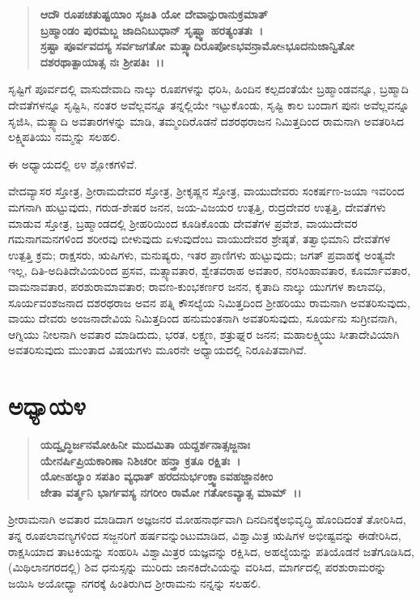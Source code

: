 \begin{verse}
\textbf{ಆದೌ ರೂಪಚತುಷ್ಟಯಿಾಂ ಸೃಜತಿ ಯೋ ದೇವಾನ್ಪುರಾನುಕ್ರಮಾತ್\\ ಬ್ರಹ್ಮಾಂಡಂ ಪುರಮಬ್ಜ ಜಾದಿನಿಬುಧಾನ್ ಸೃಷ್ಟ್ವಾ ಹರತ್ಯಂತತಃ~।}\\\textbf{ಸ್ರಷ್ಟಾ ಪೂರ್ವವದಸ್ಯ ಸರ್ವಜಗತೋ ಮತ್ಸ್ಯಾದಿರೂಪೋಽಭವನ್\break ರಾಮೋsಭೂದನುಜಾನ್ವಿತೋ ದಶರಥಾತ್ಪಾಯಾತ್ಸ ನಃ ಶ‍್ರೀಪತಿಃ~।।}
\end{verse}

ಸೃಷ್ಟಿಗೆ ಪೂರ್ವದಲ್ಲಿ ವಾಸುದೇವಾದಿ ನಾಲ್ಕು ರೂಪಗಳನ್ನು ಧರಿಸಿ, ಹಿಂದಿನ ಕಲ್ಪದಂತೆಯೇ ಬ್ರಹ್ಮಾಂಡವನ್ನೂ, ಬ್ರಹ್ಮಾದಿ ದೇವತೆಗಳನ್ನೂ ಸೃಷ್ಟಿಸಿ, ನಂತರ ಅವೆಲ್ಲವನ್ನೂ ತನ್ನಲ್ಲಿಯೇ ಇಟ್ಟುಕೊಂಡು, ಸೃಷ್ಟಿ ಕಾಲ ಬಂದಾಗ ಪುನಃ ಅವೆಲ್ಲವನ್ನೂ ಸೃಜಿಸಿ, ಮತ್ಸ್ಯಾದಿ ಅವತಾರಗಳನ್ನು ಮಾಡಿ, ತಮ್ಮಂದಿರೊಡನೆ ದಶರಥರಾಜನ ನಿಮಿತ್ತದಿಂದ ರಾಮನಾಗಿ ಅವತರಿಸಿದ ಲಕ್ಷ್ಮಿಪತಿಯು ನಮ್ಮನ್ನು ಸಲಹಲಿ.

ಈ ಅಧ್ಯಾಯದಲ್ಲಿ ೮೪ ಶ್ಲೋಕಗಳಿವೆ.

ವೇದವ್ಯಾಸರ ಸ್ತೋತ್ರ, ಶ‍್ರೀರಾಮದೇವರ ಸ್ತೋತ್ರ, ಶ‍್ರೀಕೃಷ್ಣನ ಸ್ತೋತ್ರ, ವಾಯುದೇವರು ಸಂಕರ್ಷಣ-ಜಯಾ ಇವರಿಂದ ಮಗನಾಗಿ ಹುಟ್ಟುವುದು, ಗರುಡ-ಶೇಷರ ಜನನ, ಜಯ-ವಿಜಯರ ಉತ್ಪತ್ತಿ, ರುದ್ರದೇವರ ಉತ್ಪತ್ತಿ, ದೇವತೆಗಳು ಮಾಡುವ ಸ್ತೋತ್ರ, ಬ್ರಹ್ಮಾಂಡದಲ್ಲಿ ಶ‍್ರೀಹರಿಯಿಂದ ಕೂಡಿಕೊಂಡು ದೇವತೆಗಳ ಪ್ರವೇಶ, ವಾಯುದೇವರ ಗಮನಾಗಮನಗಳಿಂದ ಶರೀರವು ಬೀಳುವುದು ಏಳುವುದೆಂಬ ವಾಯುದೇವರ ಶ್ರೇಷ್ಠತೆ, ತತ್ವಾಭಿಮಾನಿ ದೇವತೆಗಳ ಉತ್ಪತ್ತಿ ಕ್ರಮ; ರಾಕ್ಷಸರು, ಋಷಿಗಳು, ಮನುಷ್ಯರು, ಇತರ ಪ್ರಾಣಿಗಳು ಹುಟ್ಟುವುದು; ಜಗತ್ ಪ್ರವಾಹಕ್ಕೆ ಅಂತ್ಯವೇ ಇಲ್ಲ, ದಿತಿ-ಅದಿತಿದೇವಿಯರಿಂದ ಪ್ರಸವ, ಮತ್ಸ್ಯಾವತಾರ, ಶ್ವೇತವರಾಹ ಅವತಾರ, ನರಸಿಂಹಾವತಾರ, ಕೂರ್ಮಾವತಾರ, ವಾಮನಾವತಾರ, ಪರಶುರಾಮಾವತಾರ; ರಾವಣ-ಕುಂಭಕರ್ಣರ ಜನನ, ಕೃತಾದಿ ನಾಲ್ಕು ಯುಗಗಳ ಕಾಲಾವಧಿ, ಸೂರ್ಯವಂಶಜನಾದ ದಶರಥರಾಜ ಅವನ ಪತ್ನಿ ಕೌಸಲ್ಯೆಯ ನಿಮಿತ್ತದಿಂದ ಶ‍್ರೀಹರಿಯು ರಾಮನಾಗಿ ಅವತರಿಸುವುದು, ವಾಯು ದೇವರು ಅಂಜನಾದೇವಿಯ ನಿಮಿತ್ತದಿಂದ ಹನುಮಂತನಾಗಿ ಅವತರಿಸುವುದು, ಸೂರ್ಯನು ಸುಗ್ರೀವನಾಗಿ, ಆಗ್ನಿಯು ನೀಲನಾಗಿ ಅವತಾರ ಮಾಡಿದುದು, ಭರತ, ಲಕ್ಷ್ಮಣ, ಶತ್ರುಘ್ನರ ಜನನ; ಮಹಾಲಕ್ಷ್ಮಿಯು ಸೀತಾದೇವಿಯಾಗಿ ಅವತರಿಸುವುದು ಮುಂತಾದ ವಿಷಯಗಳು ಮೂರನೇ ಅಧ್ಯಾಯದಲ್ಲಿ ನಿರೂಪಿತ\-ವಾಗಿವೆ.


\section*{ಅಧ್ಯಾಯ\enginline{-}೪}

\begin{verse}
\textbf{ಯದ್ವೃದ್ಧಿರ್ಜನಮೋಹಿನೀ ಮುದಮಿತಾ ಯದ್ದರ್ಶನಾತ್ಸಜ್ಜನಾಃ}\\\textbf{ಯೇನರ್ಷಿಪ್ರಿಯಕಾರಿಣಾ ನಿಶಿಚರೀ ಹನ್ತ್ರಾ ಕ್ರತೂ ರಕ್ಷಿತಃ~।}\\\textbf{ಯೋsಹಲ್ಯಾಂ ಸಪತಿಂ ವ್ಯಧಾತ್‌ ಹರದನುರ್ಭಂಕ್ತ್ವಾಽವಹಜ್ಜಾನಕೀಂ}\\\textbf{ಜೇತಾ ವರ್ತ್ಮನಿ ಭಾರ್ಗವಸ್ಯ ನಗರೀಂ ರಾಮೋ ಗತೋಽವ್ಯಾತ್ಸ ಮಾಮ್~।।}
\end{verse}

ಶ‍್ರೀರಾಮನಾಗಿ ಅವತಾರ ಮಾಡಿದಾಗ ಅಜ್ಞಜನರ ಮೋಹನಾರ್ಥವಾಗಿ ದಿನದಿನಕ್ಕೆ\break ಅಭಿವೃದ್ಧಿ ಹೊಂದಿದಂತೆ ತೋರಿಸಿದ, ತನ್ನ ರೂಪಲಾವಣ್ಯಗಳಿಂದ ಸಜ್ಜನರಿಗೆ ಹರ್ಷವನ್ನುಂಟುಮಾಡಿದ, ವಿಶ್ವಾಮಿತ್ರ ಋಷಿಗಳ ಅಭೀಷ್ಟವನ್ನು ಈಡೇರಿಸಿದ, ರಾಕ್ಷಸಿಯಾದ ತಾಟಕಿಯನ್ನು ಸಂಹರಿಸಿ ವಿಶ್ವಾಮಿತ್ರರ ಯಜ್ಞವನ್ನು ರಕ್ಷಿಸಿದ, ಅಹಲ್ಯೆಯನ್ನು ಪತಿಯೊಡನೆ ಜತೆಗೂಡಿಸಿದ, (ಮಿಥಿಲಾನಗರದಲ್ಲಿ) ಶಿವ ಧನುಸ್ಸನ್ನು ಮುರಿದು ಜಾನಕಿದೇವಿಯನ್ನು ವರಿಸಿದ, ಮಾರ್ಗದಲ್ಲಿ ಪರಶುರಾಮರನ್ನು ಜಯಿಸಿ ಅಯೋಧ್ಯಾ ನಗರಕ್ಕೆ ಹಿಂತಿರುಗಿದ ಶ‍್ರೀರಾಮನು ನನ್ನನ್ನು ಸಲಹಲಿ.

